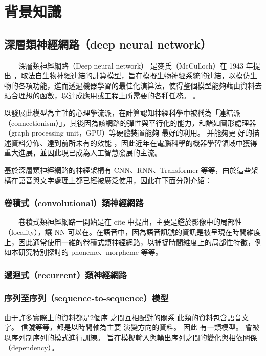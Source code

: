 

\chapter{背景知識}
\section{深層類神經網路（deep neural network）}

　　深層類神經網路（Deep neural network） 是麥氏（McCulloch）在 1943 年提出 \cite{mcculloch1943logical}，取法自生物神經連結的計算模型，旨在模擬生物神經系統的連結，以模仿生物的各項功能，進而透過機器學習的最佳化演算法，使得整個模型能夠藉由資料去貼合理想的函數，以達成應用或工程上所需要的各種任務。 。

    以發展此模型為主軸的心理學流派，在計算認知神經科學中被稱為「連結派（connectionism）」，其後因為該網路的彈性與平行化的能力，和諸如圖形處理器（graph processing unit，GPU）等硬體裝置能夠 最好的利用。 
    并能夠更 好的描述資料分佈、達到前所未有的效能 ，因此近年在電腦科學的機器學習領域中獲得重大進展，並因此現已成為人工智慧發展的主流。

    基於深層類神經網路的神經架構有 CNN、RNN、Transformer 等等，由於這些架構在語音與文字處理上都已經被廣泛使用，因此在下面分別介紹：

\subsection{卷積式（convolutional）類神經網路}

　　卷積式類神經網路一開始是在 cite 中提出，主要是鑑於影像中的局部性（locality），讓 NN 可以在。在語音中，因為語音訊號的資訊是被呈現在時間維度上，因此通常使用一維的卷積式類神經網路，以捕捉時間維度上的局部性特徵，例如本研究特別探討的 phoneme、morpheme 等等。

\subsection{遞迴式（recurrent）類神經網路}

\subsection{
    序列至序列（sequence-to-sequence）模型}
    
    由于許多實際上的資料都是2個序 之間互相配對的關系 此類的資料包含語音文字。 信號等等，都是以時間軸為主要 演變方向的資料。 因此 有一類模型。 會被以序列制序列的模式進行訓練。 旨在模擬輸入與輸出序列之間的變化與相依關係（dependency）。

